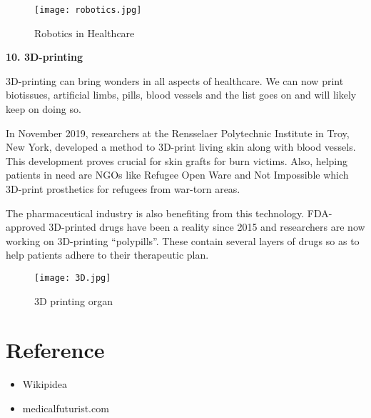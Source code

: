 \documentclass[12pt,a4paper]{article}
\begin{document}
\hspace{5cm}



\begin{figure}[h]
\centering
\texttt{[image: robotics.jpg]}
\caption{Robotics in Healthcare}
\end{figure}



\textbf{10. 3D-printing}

\hspace{1cm}

3D-printing can bring wonders in all aspects of healthcare. We can now print biotissues, artificial limbs, pills, blood vessels and the list goes on and will likely keep on doing so.

In November 2019, researchers at the Rensselaer Polytechnic Institute in Troy, New York, developed a method to 3D-print living skin along with blood vessels. This development proves crucial for skin grafts for burn victims. Also, helping patients in need are NGOs like Refugee Open Ware and Not Impossible which 3D-print prosthetics for refugees from war-torn areas. 

The pharmaceutical industry is also benefiting from this technology. FDA-approved 3D-printed drugs have been a reality since 2015 and researchers are now working on 3D-printing “polypills”. These contain several layers of drugs so as to help patients adhere to their therapeutic plan.

\hspace{5cm}

\begin{figure}[h]
\centering
\texttt{[image: 3D.jpg]}
\caption{3D printing organ}
\end{figure}


\clearpage


\section{Reference}


\begin{itemize}
\item Wikipidea
\item medicalfuturist.com
\end{itemize}
\end{document}

